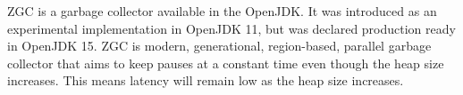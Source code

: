 
ZGC is a garbage collector available in the OpenJDK. It was introduced as an experimental implementation in OpenJDK 11, but was declared production ready in OpenJDK 15. ZGC is modern, generational, region-based, parallel garbage collector that aims to keep pauses at a constant time even though the heap size increases. This means latency will remain low as the heap size increases.%

